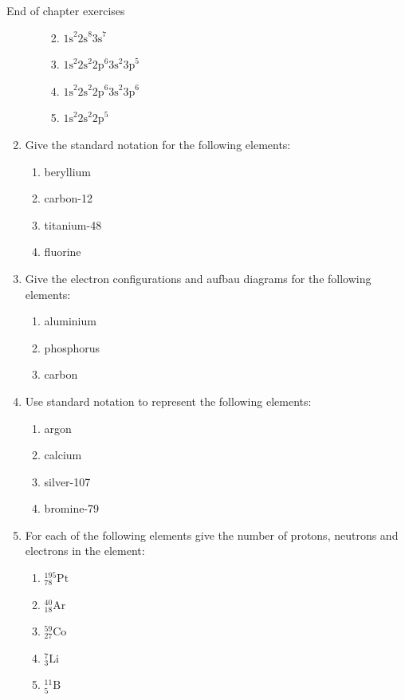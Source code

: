 \begin{eocexercises}{ End of chapter exercises}
\begin{enumerate}[noitemsep, label=\textbf{\arabic*}. ]
\begin{enumerate}[noitemsep, label=\textbf{\alph*}. ]
\begin{enumerate}[noitemsep, label=\textbf{\alph*}. ]
            \label{m38741*uid218}\item  ${1\mathrm{s}}^{2}{2\mathrm{s}}^{8}{3\mathrm{s}}^{7}$\label{m38741*uid219}\item 
${1\mathrm{s}}^{2}{2\mathrm{s}}^{2}{2\mathrm{p}}^{6}{3\mathrm{s}}^{2}{3\mathrm{p}}^{5}$
\label{m38741*uid220}\item 
${1\mathrm{s}}^{2}{2\mathrm{s}}^{2}{2\mathrm{p}}^{6}{3\mathrm{s}}^{2}{3\mathrm{p}}^{6}$\label{m38741*uid221}\item 
${1\mathrm{s}}^{2}{2\mathrm{s}}^{2}{2\mathrm{p}}^{5}$\end{enumerate}
                \end{enumerate}
        \item Give the standard notation for the following elements:
\label{m38741*id8223}\begin{enumerate}[noitemsep, label=\textbf{\alph*}. ] 
            \item beryllium\item carbon-12\item titanium-48\item fluorine\end{enumerate}
\item Give the electron configurations and aufbau diagrams for the following elements:\label{m38741*id7624}\begin{enumerate}[noitemsep, label=\textbf{\alph*}. ] 
            \item aluminium\item phosphorus\item carbon\end{enumerate}
\item Use standard notation to represent the following elements: \label{m38741*id74324}\begin{enumerate}[noitemsep, label=\textbf{\alph*}. ] 
            \item argon\item calcium\item silver-107\item bromine-79\end{enumerate}
\item For each of the following elements give the number of protons, neutrons and electrons in the element: \label{m38741*id74374}\begin{enumerate}[noitemsep, label=\textbf{\alph*}. ] 
            \item $_{78}^{195}\mathrm{Pt}$\item $_{18}^{40}\mathrm{Ar}$\item $_{27}^{59}\mathrm{Co}$\item $_{3}^{7}\mathrm{Li}$\item $_{5}^{11}\mathrm{B}$\end{enumerate}

\end{enumerate}
\end{eocexercises}
